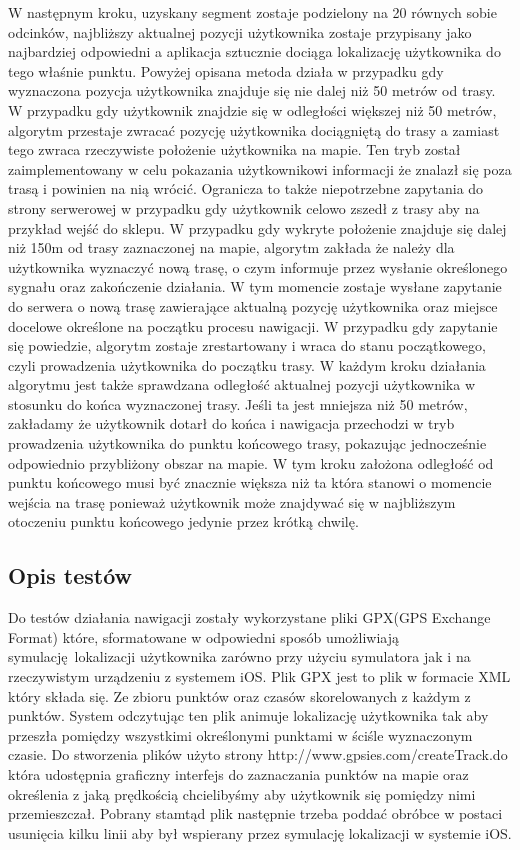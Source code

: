 W następnym kroku, uzyskany segment zostaje podzielony na 20 równych sobie odcinków, najbliższy aktualnej pozycji użytkownika zostaje przypisany jako najbardziej odpowiedni a aplikacja sztucznie dociąga lokalizację użytkownika do tego właśnie punktu. \newline
Powyżej opisana metoda działa w przypadku gdy wyznaczona pozycja użytkownika znajduje się nie dalej niż 50 metrów od trasy. W przypadku gdy użytkownik znajdzie się w odległości większej niż 50 metrów, algorytm przestaje zwracać pozycję użytkownika dociągniętą do trasy a zamiast tego zwraca rzeczywiste położenie użytkownika na mapie. Ten tryb został zaimplementowany w celu pokazania użytkownikowi informacji że znalazł się poza trasą i powinien na nią wrócić. Ogranicza to także niepotrzebne zapytania do strony serwerowej w przypadku gdy użytkownik celowo zszedł z trasy aby na przykład wejść do sklepu.
W przypadku gdy wykryte położenie znajduje się dalej niż 150m od trasy zaznaczonej na mapie, algorytm zakłada że należy dla użytkownika wyznaczyć nową trasę, o czym informuje przez wysłanie określonego sygnału oraz zakończenie działania. W tym momencie zostaje wysłane zapytanie do serwera o nową trasę zawierające aktualną pozycję użytkownika oraz miejsce docelowe określone na początku procesu nawigacji. W przypadku gdy zapytanie się powiedzie, algorytm zostaje zrestartowany i wraca do stanu początkowego, czyli prowadzenia użytkownika do początku trasy.
W każdym kroku działania algorytmu jest także sprawdzana odległość aktualnej pozycji użytkownika w stosunku do końca wyznaczonej trasy. Jeśli ta jest mniejsza niż 50 metrów, zakładamy że użytkownik dotarł do końca i nawigacja przechodzi w tryb prowadzenia użytkownika do punktu końcowego trasy, pokazując jednocześnie odpowiednio przybliżony obszar na mapie. W tym kroku założona odległość od punktu końcowego musi być znacznie większa niż ta która stanowi o momencie wejścia na trasę ponieważ użytkownik może znajdywać się w najbliższym otoczeniu punktu końcowego jedynie przez krótką chwilę.


\subsection{Opis testów}

Do testów działania nawigacji zostały wykorzystane pliki GPX(GPS Exchange Format) które, sformatowane w odpowiedni sposób umożliwiają symulację lokalizacji użytkownika zarówno przy użyciu symulatora jak i na rzeczywistym urządzeniu z systemem iOS. Plik GPX jest to plik w formacie XML który składa się. Ze zbioru punktów oraz czasów skorelowanych z każdym z punktów. System odczytując ten plik animuje lokalizację użytkownika tak aby przeszła pomiędzy wszystkimi określonymi punktami w ściśle wyznaczonym czasie. Do stworzenia plików użyto strony http://www.gpsies.com/createTrack.do która udostępnia graficzny interfejs do zaznaczania punktów na mapie oraz określenia z jaką prędkością chcielibyśmy aby użytkownik się pomiędzy nimi przemieszczał. Pobrany stamtąd plik następnie trzeba poddać obróbce w postaci usunięcia kilku linii aby był wspierany przez symulację lokalizacji w systemie iOS.

